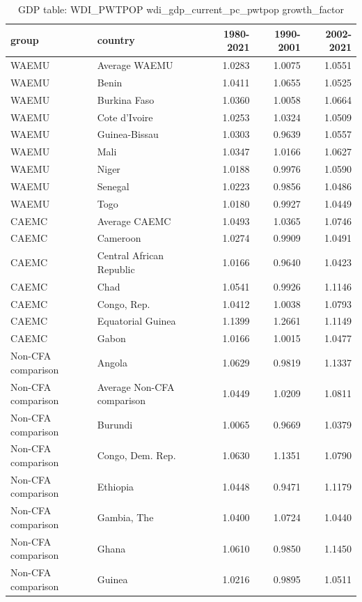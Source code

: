 \begin{table}

\caption{GDP table: WDI_PWTPOP wdi_gdp_current_pc_pwtpop growth_factor}
\centering
\begin{tabular}[t]{llrrr}
\toprule
group & country & 1980-2021 & 1990-2001 & 2002-2021\\
\midrule
WAEMU & Average WAEMU & 1.0283 & 1.0075 & 1.0551\\
WAEMU & Benin & 1.0411 & 1.0655 & 1.0525\\
WAEMU & Burkina Faso & 1.0360 & 1.0058 & 1.0664\\
WAEMU & Cote d'Ivoire & 1.0253 & 1.0324 & 1.0509\\
WAEMU & Guinea-Bissau & 1.0303 & 0.9639 & 1.0557\\
\addlinespace
WAEMU & Mali & 1.0347 & 1.0166 & 1.0627\\
WAEMU & Niger & 1.0188 & 0.9976 & 1.0590\\
WAEMU & Senegal & 1.0223 & 0.9856 & 1.0486\\
WAEMU & Togo & 1.0180 & 0.9927 & 1.0449\\
CAEMC & Average CAEMC & 1.0493 & 1.0365 & 1.0746\\
\addlinespace
CAEMC & Cameroon & 1.0274 & 0.9909 & 1.0491\\
CAEMC & Central African Republic & 1.0166 & 0.9640 & 1.0423\\
CAEMC & Chad & 1.0541 & 0.9926 & 1.1146\\
CAEMC & Congo, Rep. & 1.0412 & 1.0038 & 1.0793\\
CAEMC & Equatorial Guinea & 1.1399 & 1.2661 & 1.1149\\
\addlinespace
CAEMC & Gabon & 1.0166 & 1.0015 & 1.0477\\
Non-CFA comparison & Angola & 1.0629 & 0.9819 & 1.1337\\
Non-CFA comparison & Average Non-CFA comparison & 1.0449 & 1.0209 & 1.0811\\
Non-CFA comparison & Burundi & 1.0065 & 0.9669 & 1.0379\\
Non-CFA comparison & Congo, Dem. Rep. & 1.0630 & 1.1351 & 1.0790\\
\addlinespace
Non-CFA comparison & Ethiopia & 1.0448 & 0.9471 & 1.1179\\
Non-CFA comparison & Gambia, The & 1.0400 & 1.0724 & 1.0440\\
Non-CFA comparison & Ghana & 1.0610 & 0.9850 & 1.1450\\
Non-CFA comparison & Guinea & 1.0216 & 0.9895 & 1.0511\\

\end{tabular}
\end{table}
